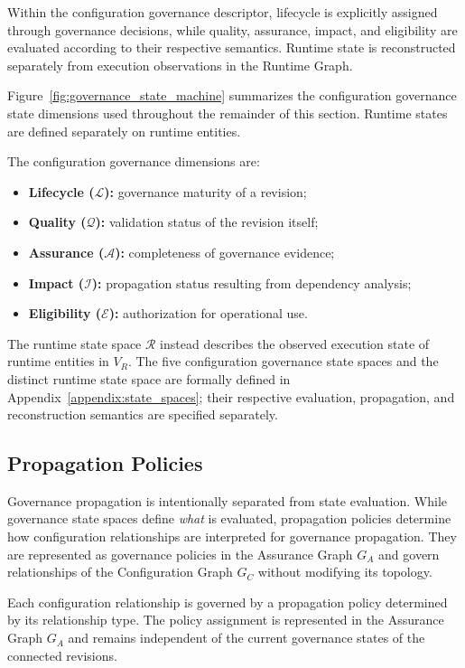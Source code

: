 \documentclass[10pt]{article}
\begin{document}
Within the configuration governance descriptor, lifecycle is explicitly assigned through governance decisions, while quality, assurance, impact, and eligibility are evaluated according to their respective semantics. Runtime state is reconstructed separately from execution observations in the Runtime Graph.

Figure~\ref{fig:governance_state_machine} summarizes the configuration
governance state dimensions used throughout the remainder of this section.
Runtime states are defined separately on runtime entities.

The configuration governance dimensions are:

\begin{itemize}
	\item \textbf{Lifecycle ($\mathcal{L}$):} governance maturity of a revision;
	\item \textbf{Quality ($\mathcal{Q}$):} validation status of the revision itself;
	\item \textbf{Assurance ($\mathcal{A}$):} completeness of governance evidence;
	\item \textbf{Impact ($\mathcal{I}$):} propagation status resulting from dependency analysis;
	\item \textbf{Eligibility ($\mathcal{E}$):} authorization for operational use.
\end{itemize}

The runtime state space $\mathcal{R}$ instead describes the observed execution
state of runtime entities in $V_R$. The five configuration governance state
spaces and the distinct runtime state space are formally defined in
Appendix~\ref{appendix:state_spaces}; their respective evaluation,
propagation, and reconstruction semantics are specified separately.

\subsection{Propagation Policies}
\label{sec:propagation_policies}

Governance propagation is intentionally separated from state evaluation. While governance state spaces define \emph{what} is evaluated, propagation policies determine how configuration relationships are interpreted for governance propagation. They are represented as governance policies in the Assurance Graph $G_A$ and govern relationships of the Configuration Graph $G_C$ without modifying its topology.

Each configuration relationship is governed by a propagation policy determined by its relationship type. The policy assignment is represented in the Assurance Graph $G_A$ and remains independent of the current governance states of the connected revisions.
\end{document}
